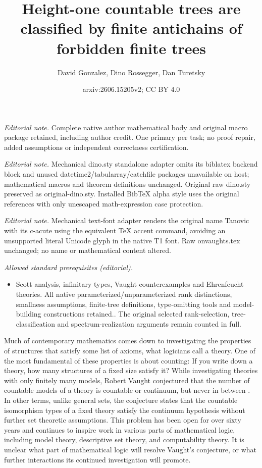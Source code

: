 \documentclass[10pt,a4paper]{amsart}
\title{Height-one countable trees are classified by finite antichains of forbidden finite trees}
\author{David Gonzalez, Dino Rossegger, Dan Turetsky}
\date{arxiv:2606.15205v2; CC BY 4.0}
\renewcommand{\-}{\text{-}}
\begin{document}
\maketitle
\noindent\textit{Editorial note.} Complete native author mathematical body and original macro package retained, including author credit. One primary per task; no proof repair, added assumptions or independent correctness certification.\par\medskip
\noindent\textit{Editorial note.} Mechanical dino.sty standalone adapter omits its biblatex backend block and unused datetime2/tabularray/catchfile packages unavailable on host; mathematical macros and theorem definitions unchanged. Original raw dino.sty preserved as original-dino.sty. Installed BibTeX alpha style uses the original references with only unescaped math-expression case protection.\par\medskip
\noindent\textit{Editorial note.} Mechanical text-font adapter renders the original name Tanovic with its c-acute using the equivalent TeX accent command, avoiding an unsupported literal Unicode glyph in the native T1 font. Raw onvaughts.tex unchanged; no name or mathematical content altered.\par\medskip
\noindent\textit{Allowed standard prerequisites (editorial).}\begin{itemize}
\item Scott analysis, infinitary types, Vaught counterexamples and Ehrenfeucht theories. All native parameterized/unparameterized rank distinctions, smallness assumptions, finite-tree definitions, type-omitting tools and model-building constructions retained.. The original selected rank-selection, tree-classification and spectrum-realization arguments remain counted in full.
\end{itemize}\medskip
Much of contemporary mathematics comes down to investigating the properties of structures that satisfy some list of axioms, what logicians call a theory.
One of the most fundamental of these properties is about counting:
If you write down a theory, how many structures of a fixed size satisfy it?
While investigating theories with only finitely many models, Robert Vaught conjectured that the number of countable models of a theory is countable or continuum, but never in between \cite{Vau61}.
In other terms, unlike general sets, the conjecture states that the countable isomorphism types of a fixed theory satisfy the continuum hypothesis without further set theoretic assumptions.
This problem has been open for over sixty years and continues to inspire work in various parts of mathematical logic, including model theory, descriptive set theory, and computability theory.
It is unclear what part of mathematical logic will resolve Vaught's conjecture, or what further interactions its continued investigation will promote.
\end{document}
